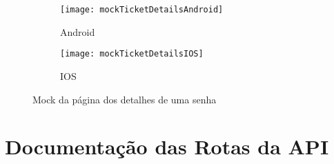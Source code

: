 \begin{figure}
\centering
\begin{subfigure}{.5\textwidth}
  \centering
  \texttt{[image: mockTicketDetailsAndroid]}
  \caption{Android}
  \label{fig:ticketDetailsAndroid}
\end{subfigure}%
\begin{subfigure}{.5\textwidth}
  \centering
  \texttt{[image: mockTicketDetailsIOS]}
  \caption{IOS}
  \label{fig:ticketDetailsIos}
\end{subfigure}
\caption{Mock da página dos detalhes de uma senha}
\label{fig:mockTicketDetails}
\end{figure}

\appendix
\chapter{Documentação das Rotas da API}




